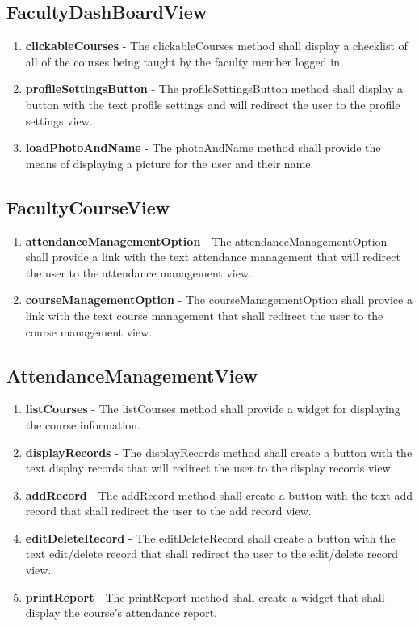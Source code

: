 \documentclass[letterpaper,12pt,oneside,listof=totoc]{scrreprt}
\begin{document}
\subsection{FacultyDashBoardView}
\begin{enumerate}
    \item \textbf{clickableCourses} - The clickableCourses method shall display a checklist of all of the courses being taught by the faculty member logged in.
    \item \textbf{profileSettingsButton} - The profileSettingsButton method shall display a button with the text profile settings and will redirect the user to the profile settings view.
    \item \textbf{loadPhotoAndName} - The photoAndName method shall provide the means of displaying a picture for the user and their name.
\end{enumerate}

\subsection{FacultyCourseView}
\begin{enumerate}
    \item \textbf{attendanceManagementOption} - The attendanceManagementOption shall provide a link with the text attendance management that will redirect the user to the attendance management view.
    \item \textbf{courseManagementOption} - The courseManagementOption shall provice a link with the text course management that shall redirect the user to the course management view.
\end{enumerate}

\subsection{AttendanceManagementView}
\begin{enumerate}
    \item \textbf{listCourses} - The listCourses method shall provide a widget for displaying the course information.
    \item \textbf{displayRecords} - The displayRecords method shall create a button with the text display records that will redirect the user to the display records view.
    \item \textbf{addRecord} - The addRecord method shall create a button with the text add record that shall redirect the user to the add record view.
    \item \textbf{editDeleteRecord} - The editDeleteRecord shall create a button with the text edit/delete record that shall redirect the user to the edit/delete record view.
    \item \textbf{printReport} - The printReport method shall create a widget that shall display the course's attendance report.
\end{enumerate}
\end{document}
